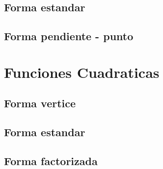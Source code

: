 \documentclass[11pt]{article}
\begin{document}
	\subsection{Forma estandar}
	\subsection{Forma pendiente - punto}
\section{Funciones Cuadraticas}
	\subsection{Forma vertice}
	\subsection{Forma estandar}
	\subsection{Forma factorizada}
\end{document}
